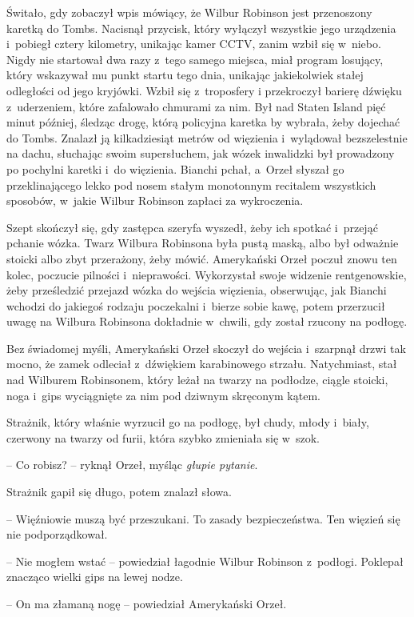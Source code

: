 \documentclass[oneside,polish,11pt,sfheadings]{mwbk}
\begin{document}
Świtało, gdy zobaczył wpis mówiący, że Wilbur Robinson jest przenoszony
karetką do Tombs. Nacisnął przycisk, który wyłączył wszystkie jego
urządzenia i~pobiegł cztery kilometry, unikając kamer CCTV, zanim wzbił
się w~niebo. Nigdy nie startował dwa razy z~tego samego miejsca, miał
program losujący, który wskazywał mu punkt startu tego dnia, unikając
jakiekolwiek stałej odległości od jego kryjówki. Wzbił się z~troposfery
i przekroczył barierę dźwięku z~uderzeniem, które zafalowało chmurami za
nim. Był nad Staten Island pięć minut później, śledząc drogę, którą
policyjna karetka by wybrała, żeby dojechać do Tombs. Znalazł ją
kilkadziesiąt metrów od więzienia i~wylądował bezszelestnie na dachu,
słuchając swoim supersłuchem, jak wózek inwalidzki był prowadzony po
pochylni karetki i~do więzienia. Bianchi pchał, a~Orzeł słyszał go
przeklinającego lekko pod nosem stałym monotonnym recitalem wszystkich
sposobów, w~jakie Wilbur Robinson zapłaci za wykroczenia.

Szept skończył się, gdy zastępca szeryfa wyszedł, żeby ich spotkać i~przejąć pchanie wózka. Twarz Wilbura Robinsona była pustą maską, albo
był odważnie stoicki albo zbyt przerażony, żeby mówić. Amerykański Orzeł
poczuł znowu ten kolec, poczucie pilności i~nieprawości. Wykorzystał
swoje widzenie rentgenowskie, żeby prześledzić przejazd wózka do wejścia
więzienia, obserwując, jak Bianchi wchodzi do jakiegoś rodzaju
poczekalni i~bierze sobie kawę, potem przerzucił uwagę na Wilbura
Robinsona dokładnie w~chwili, gdy został rzucony na podłogę.

Bez świadomej myśli, Amerykański Orzeł skoczył do wejścia i~szarpnął
drzwi tak mocno, że zamek odleciał z~dźwiękiem karabinowego strzału.
Natychmiast, stał nad Wilburem Robinsonem, który leżał na twarzy na
podłodze, ciągle stoicki, noga i~gips wyciągnięte za nim pod dziwnym
skręconym kątem.

Strażnik, który właśnie wyrzucił go na podłogę, był chudy, młody i~biały, czerwony na twarzy od furii, która szybko zmieniała się w~szok.

-- Co robisz? -- ryknął Orzeł, myśląc \textit{głupie pytanie}.

Strażnik gapił się długo, potem znalazł słowa. 

-- Więźniowie muszą być
przeszukani. To zasady bezpieczeństwa. Ten więzień się nie
podporządkował.

-- Nie mogłem wstać -- powiedział łagodnie Wilbur Robinson z~podłogi.
Poklepał znacząco wielki gips na lewej nodze.

-- On ma złamaną nogę -- powiedział Amerykański Orzeł.
\end{document}
